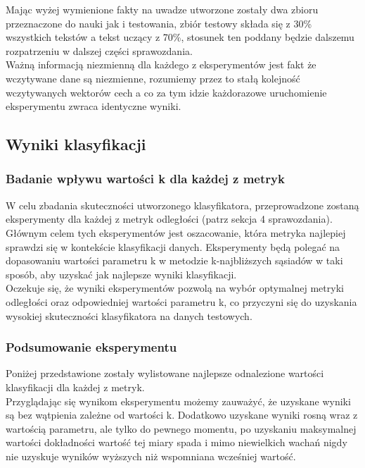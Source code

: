 \documentclass{article}
\begin{document}
\noindent Mając wyżej wymienione fakty na uwadze utworzone zostały dwa zbioru przeznaczone do nauki jak i testowania, zbiór testowy składa się z 30\% wszystkich tekstów a tekst uczący z 70\%, stosunek ten poddany będzie dalszemu rozpatrzeniu w dalszej części sprawozdania. \\

\noindent Ważną informacją niezmienną dla każdego z eksperymentów jest fakt że wczytywane dane są niezmienne, rozumiemy przez to stałą kolejność wczytywanych wektorów cech a co za tym idzie każdorazowe uruchomienie eksperymentu zwraca identyczne wyniki.

\subsection*{Wyniki klasyfikacji}

\subsubsection*{Badanie wpływu wartości k dla każdej z metryk}

W celu zbadania skuteczności utworzonego klasyfikatora, przeprowadzone zostaną eksperymenty dla każdej z metryk odległości (patrz sekcja 4 sprawozdania). Głównym celem tych eksperymentów jest oszacowanie, która metryka najlepiej sprawdzi się w kontekście klasyfikacji danych. Eksperymenty będą polegać na dopasowaniu wartości parametru k w metodzie k-najbliższych sąsiadów w taki sposób, aby uzyskać jak najlepsze wyniki klasyfikacji. \\

\noindent Oczekuje się, że wyniki eksperymentów pozwolą na wybór optymalnej metryki odległości oraz odpowiedniej wartości parametru k, co przyczyni się do uzyskania wysokiej skuteczności klasyfikatora na danych testowych.






\subsubsection*{Podsumowanie eksperymentu}

\noindent Poniżej przedstawione zostały wylistowane najlepsze odnalezione wartości klasyfikacji dla każdej z metryk. \\



Przyglądając się wynikom eksperymentu możemy zauważyć, że uzyskane wyniki są bez wątpienia zależne od wartości k. Dodatkowo uzyskane wyniki rosną wraz z wartością parametru, ale tylko do pewnego momentu, po uzyskaniu maksymalnej wartości dokładności wartość tej miary spada i mimo niewielkich wachań nigdy nie uzyskuje wyników wyższych niż wspomniana wcześniej wartość. \\
\end{document}
